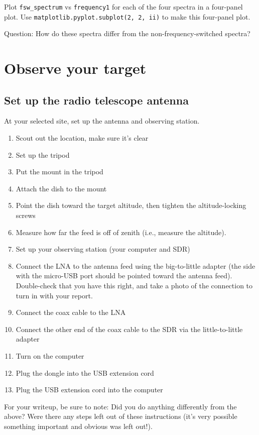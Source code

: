 \documentclass[11pt]{article}
\begin{document}
Plot \verb|fsw_spectrum| vs \verb|frequency1| for each of the four spectra in a four-panel plot.
Use \verb|matplotlib.pyplot.subplot(2, 2, ii)| to make this four-panel plot.

Question: How do these spectra differ from the non-frequency-switched spectra?


\clearpage
\section{Observe your target}
\label{sec:observe}
\subsection{Set up the radio telescope antenna}
At your selected site, set up the antenna and observing station.

\begin{enumerate}
    \item Scout out the location, make sure it's clear
    \item Set up the tripod
    \item Put the mount in the tripod
    \item Attach the dish to the mount
    \item Point the dish toward the target altitude, then tighten the altitude-locking screws
    \item Measure how far the feed is off of zenith (i.e., measure the altitude).
    \item Set up your observing station (your computer and SDR)
    \item Connect the LNA to the antenna feed using the big-to-little adapter
        (the side with the micro-USB port should be pointed toward the antenna
        feed).  Double-check that you have this right, and take a photo of the connection to turn in with your report.
    \item Connect the coax cable to the LNA
    \item Connect the other end of the coax cable to the SDR via the little-to-little adapter
    \item Turn on the computer
    \item Plug the dongle into the USB extension cord
    \item Plug the USB extension cord into the computer
\end{enumerate}

For your writeup, be sure to note: Did you do anything differently from the above?
Were there any steps left out of these instructions (it's very possible something important
and obvious was left out!).
\end{document}
